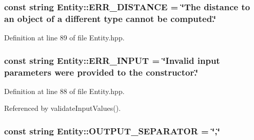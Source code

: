 \hypertarget{classmultiscale_1_1analysis_1_1Entity_a0904a1ab1e3f71e0702ace23b665cf0e}{
\subsubsection[{\-E\-R\-R\-\_\-\-D\-I\-S\-T\-A\-N\-C\-E}]{\setlength{\rightskip}{0pt plus 5cm}const string {\bf \-Entity\-::\-E\-R\-R\-\_\-\-D\-I\-S\-T\-A\-N\-C\-E} = \char`\"{}\-The distance to an object of a different type cannot be computed.\char`\"{}}}\label{classmultiscale_1_1analysis_1_1Entity_a0904a1ab1e3f71e0702ace23b665cf0e}


\-Definition at line 89 of file \-Entity.\-hpp.

\hypertarget{classmultiscale_1_1analysis_1_1Entity_a52a27753c0da593552f585f540f003ff}{
\subsubsection[{\-E\-R\-R\-\_\-\-I\-N\-P\-U\-T}]{\setlength{\rightskip}{0pt plus 5cm}const string {\bf \-Entity\-::\-E\-R\-R\-\_\-\-I\-N\-P\-U\-T} = \char`\"{}\-Invalid input parameters were provided to the constructor.\char`\"{}}}\label{classmultiscale_1_1analysis_1_1Entity_a52a27753c0da593552f585f540f003ff}


\-Definition at line 88 of file \-Entity.\-hpp.



\-Referenced by validate\-Input\-Values().

\hypertarget{classmultiscale_1_1analysis_1_1Entity_afe861959b8b22bec466e8118a09ccb54}{
\subsubsection[{\-O\-U\-T\-P\-U\-T\-\_\-\-S\-E\-P\-A\-R\-A\-T\-O\-R}]{\setlength{\rightskip}{0pt plus 5cm}const string {\bf \-Entity\-::\-O\-U\-T\-P\-U\-T\-\_\-\-S\-E\-P\-A\-R\-A\-T\-O\-R} = \char`\"{},\char`\"{}}}\label{classmultiscale_1_1analysis_1_1Entity_afe861959b8b22bec466e8118a09ccb54}


